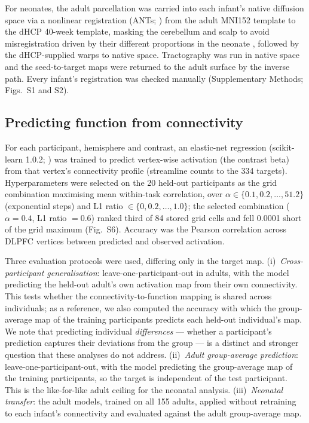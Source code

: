 \documentclass[11pt]{article}
\begin{document}
For neonates, the adult parcellation was carried into each infant's native
diffusion space via a nonlinear registration (ANTs;
\citealp{avants2008}) from the adult MNI152 template to the dHCP 40-week
template, masking the cerebellum and scalp to avoid misregistration driven
by their different proportions in the neonate \citep{cabral2022}, followed
by the dHCP-supplied warps to native space. Tractography was run in native
space and the seed-to-target maps were returned to the adult surface by the
inverse path. Every infant's registration was checked manually
(Supplementary Methods; Figs.~S1 and S2).

\subsection{Predicting function from connectivity}

For each participant, hemisphere and contrast, an elastic-net regression
(scikit-learn 1.0.2; \citealp{pedregosa2011}) was trained to predict
vertex-wise activation (the contrast beta) from that vertex's connectivity
profile (streamline counts to the 334 targets). Hyperparameters were
selected on the 20 held-out participants as the grid combination maximising
mean within-task correlation, over $\alpha \in \{0.1, 0.2, \ldots, 51.2\}$
(exponential steps) and L1 ratio $\in \{0, 0.2, \ldots, 1.0\}$; the selected
combination ($\alpha = 0.4$, L1 ratio $= 0.6$) ranked third of 84 stored
grid cells and fell 0.0001 short of the grid maximum (Fig.~S6). Accuracy was
the Pearson correlation across DLPFC vertices between predicted and observed
activation.

Three evaluation protocols were used, differing only in the target map.
(i)~\emph{Cross-participant generalisation}: leave-one-participant-out in
adults, with the model predicting the held-out adult's own activation map
from their own connectivity. This tests whether the connectivity-to-function
mapping is shared across individuals; as a reference, we also computed the
accuracy with which the group-average map of the training participants
predicts each held-out individual's map. We note that predicting individual
\emph{differences} --- whether a participant's prediction captures their
deviations from the group --- is a distinct and stronger question that these
analyses do not address. (ii)~\emph{Adult group-average prediction}:
leave-one-participant-out, with the model predicting the group-average map
of the training participants, so the target is independent of the test
participant. This is the like-for-like adult ceiling for the neonatal
analysis. (iii)~\emph{Neonatal transfer}: the adult models, trained on all
155 adults, applied without retraining to each infant's connectivity and
evaluated against the adult group-average map.
\end{document}
